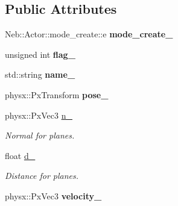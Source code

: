 \subsection*{Public Attributes}
\begin{DoxyCompactItemize}
\item 
\hypertarget{classNeb_1_1Actor_1_1Util_1_1Raw_a663f694b0585b89e0c812bca7ac648b2}{Neb\-::\-Actor\-::mode\-\_\-create\-::e {\bfseries mode\-\_\-create\-\_\-}}\label{classNeb_1_1Actor_1_1Util_1_1Raw_a663f694b0585b89e0c812bca7ac648b2}

\item 
\hypertarget{classNeb_1_1Actor_1_1Util_1_1Raw_afb5e7dc61f81b2a46540ca3950f8986b}{unsigned int {\bfseries flag\-\_\-}}\label{classNeb_1_1Actor_1_1Util_1_1Raw_afb5e7dc61f81b2a46540ca3950f8986b}

\item 
\hypertarget{classNeb_1_1Actor_1_1Util_1_1Raw_a8051b7e615563eb672ae866f8e1eda41}{std\-::string {\bfseries name\-\_\-}}\label{classNeb_1_1Actor_1_1Util_1_1Raw_a8051b7e615563eb672ae866f8e1eda41}

\item 
\hypertarget{classNeb_1_1Actor_1_1Util_1_1Raw_a6465539ecb39006f028d53b18bf863d4}{physx\-::\-Px\-Transform {\bfseries pose\-\_\-}}\label{classNeb_1_1Actor_1_1Util_1_1Raw_a6465539ecb39006f028d53b18bf863d4}

\item 
\hypertarget{classNeb_1_1Actor_1_1Util_1_1Raw_ae406e5f06446cf59a4a8bc497558a108}{physx\-::\-Px\-Vec3 \hyperlink{classNeb_1_1Actor_1_1Util_1_1Raw_ae406e5f06446cf59a4a8bc497558a108}{n\-\_\-}}\label{classNeb_1_1Actor_1_1Util_1_1Raw_ae406e5f06446cf59a4a8bc497558a108}

\begin{DoxyCompactList}\small\item\em Normal for planes. \end{DoxyCompactList}\item 
\hypertarget{classNeb_1_1Actor_1_1Util_1_1Raw_afc9237b8b83472e7e15ab8d8f0f00511}{float \hyperlink{classNeb_1_1Actor_1_1Util_1_1Raw_afc9237b8b83472e7e15ab8d8f0f00511}{d\-\_\-}}\label{classNeb_1_1Actor_1_1Util_1_1Raw_afc9237b8b83472e7e15ab8d8f0f00511}

\begin{DoxyCompactList}\small\item\em Distance for planes. \end{DoxyCompactList}\item 
\hypertarget{classNeb_1_1Actor_1_1Util_1_1Raw_a95b83aa1ee8857e7bf8f7c338639ac3a}{physx\-::\-Px\-Vec3 {\bfseries velocity\-\_\-}}\label{classNeb_1_1Actor_1_1Util_1_1Raw_a95b83aa1ee8857e7bf8f7c338639ac3a}


\end{DoxyCompactItemize}
